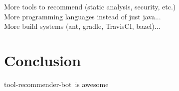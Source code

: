 \documentclass[conference]{IEEEtran}
\newcommand{\tool}{tool-recommender-bot}
\begin{document}
More tools to recommend (static analysis, security, etc.) \\

More programming languages instead of just java...\\

More build systems (ant, gradle, TravisCI, bazel)...\\

\section{Conclusion}

\tool~is awesome




  
%

\end{document}
